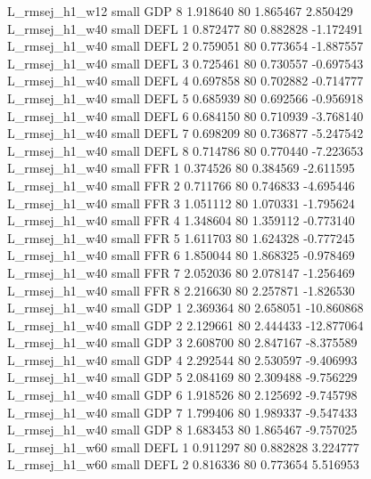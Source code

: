 L_rmsej_h1_w12      small      GDP                 8 1.918640 80       1.865467           2.850429
L_rmsej_h1_w40      small     DEFL                 1 0.872477 80       0.882828          -1.172491
L_rmsej_h1_w40      small     DEFL                 2 0.759051 80       0.773654          -1.887557
L_rmsej_h1_w40      small     DEFL                 3 0.725461 80       0.730557          -0.697543
L_rmsej_h1_w40      small     DEFL                 4 0.697858 80       0.702882          -0.714777
L_rmsej_h1_w40      small     DEFL                 5 0.685939 80       0.692566          -0.956918
L_rmsej_h1_w40      small     DEFL                 6 0.684150 80       0.710939          -3.768140
L_rmsej_h1_w40      small     DEFL                 7 0.698209 80       0.736877          -5.247542
L_rmsej_h1_w40      small     DEFL                 8 0.714786 80       0.770440          -7.223653
L_rmsej_h1_w40      small      FFR                 1 0.374526 80       0.384569          -2.611595
L_rmsej_h1_w40      small      FFR                 2 0.711766 80       0.746833          -4.695446
L_rmsej_h1_w40      small      FFR                 3 1.051112 80       1.070331          -1.795624
L_rmsej_h1_w40      small      FFR                 4 1.348604 80       1.359112          -0.773140
L_rmsej_h1_w40      small      FFR                 5 1.611703 80       1.624328          -0.777245
L_rmsej_h1_w40      small      FFR                 6 1.850044 80       1.868325          -0.978469
L_rmsej_h1_w40      small      FFR                 7 2.052036 80       2.078147          -1.256469
L_rmsej_h1_w40      small      FFR                 8 2.216630 80       2.257871          -1.826530
L_rmsej_h1_w40      small      GDP                 1 2.369364 80       2.658051         -10.860868
L_rmsej_h1_w40      small      GDP                 2 2.129661 80       2.444433         -12.877064
L_rmsej_h1_w40      small      GDP                 3 2.608700 80       2.847167          -8.375589
L_rmsej_h1_w40      small      GDP                 4 2.292544 80       2.530597          -9.406993
L_rmsej_h1_w40      small      GDP                 5 2.084169 80       2.309488          -9.756229
L_rmsej_h1_w40      small      GDP                 6 1.918526 80       2.125692          -9.745798
L_rmsej_h1_w40      small      GDP                 7 1.799406 80       1.989337          -9.547433
L_rmsej_h1_w40      small      GDP                 8 1.683453 80       1.865467          -9.757025
L_rmsej_h1_w60      small     DEFL                 1 0.911297 80       0.882828           3.224777
L_rmsej_h1_w60      small     DEFL                 2 0.816336 80       0.773654           5.516953
